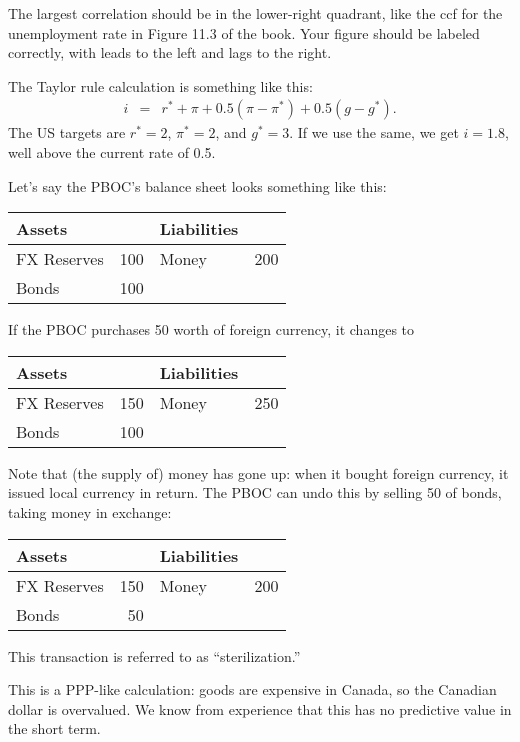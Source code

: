 \documentclass[letterpaper,12pt]{exam}
\begin{document}
\begin{questions}
\begin{solution}
\begin{parts}
\item The largest correlation should be in the lower-right quadrant,
like the ccf for the unemployment rate in Figure 11.3 of the book.
Your figure should be labeled correctly, with leads to the left and
lags to the right.

\item The Taylor rule calculation is something like this:
\begin{eqnarray*}
    i &=& r^* + \pi + 0.5 (\pi - \pi^*) + 0.5 (g - g^*) .
\end{eqnarray*}
The US targets are
$ r^* = 2$, $\pi^* = 2$, and $g^* = 3$.
If we use the same, we get $i = 1.8$, well above the current rate of 0.5.

\item Let's say the PBOC's balance sheet looks something like this:
%
\begin{center}
\begin{tabular}{lr|lr}
               Assets  &     &     Liabilities                     \\
               \hline
               FX Reserves &  100 &     Money &  200   \\
               Bonds   & 100 & \\
\end{tabular}
\end{center}
%
If the PBOC purchases 50 worth of foreign currency,
it changes to
%
\begin{center}
\begin{tabular}{lr|lr}
               Assets  &     &     Liabilities                     \\
               \hline
               FX Reserves &  150 &     Money  &  250   \\
               Bonds   & 100 & \\
\end{tabular}
\end{center}
%
Note that (the supply of) money has gone up:  when it bought foreign currency,
it issued local currency in return.
The PBOC can undo this by selling 50 of bonds, taking money
in exchange:
%
\begin{center}
\begin{tabular}{lr|lr}
               Assets  &     &     Liabilities                     \\
               \hline
               FX Reserves &  150 &     Money  &  200   \\
               Bonds   & 50 & \\
\end{tabular}
\end{center}
%
This transaction is referred to as ``sterilization.''

\item This is a PPP-like calculation:  goods are expensive in Canada,
so the Canadian dollar is overvalued.
We know from experience that this has no predictive value in the short term.
\end{parts}
\end{solution}

\end{questions}
\end{document}
